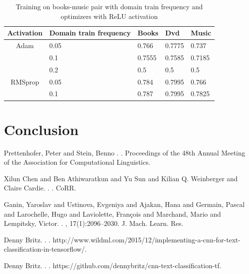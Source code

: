 \documentclass[11pt,a4paper]{article}
\begin{document}
\begin{table}[h]
\begin{center}
\begin{tabular}{|c|l|l|l|l|}
\hline
Activation & \multicolumn{1}{|p{1cm}|}{Domain train frequency}& Books & Dvd & Music \\
\hline
Adam & 0.05 & 0.766 & 0.7775 & 0.737 \\
 & 0.1 & 0.7555 & 0.7585 & 0.7185 \\
 & 0.2 & 0.5 & 0.5 & 0.5 \\
\hline
RMSprop & 0.05 & 0.784 & 0.7995 & 0.766 \\
 & 0.1 & 0.787 & 0.7995 & 0.7825 \\
\hline
\end{tabular}
\end{center}
\caption{ Training on books-music pair with domain train frequency and optimizers with ReLU activation}
\label{1d-optimizer-table}
\end{table}





\section{Conclusion}



%
%

\begin{thebibliography}{}
Prettenhofer, Peter and Stein, Benno
.
.
\newblock Proceedings of the 48th Annual Meeting of the Association for Computational Linguistics.

Xilun Chen and Ben Athiwaratkun and Yu Sun and Kilian Q. Weinberger and Claire Cardie.
.
.
\newblock CoRR.

Ganin, Yaroslav and Ustinova, Evgeniya and Ajakan, Hana and Germain, Pascal and Larochelle, Hugo and Laviolette, Fran\c{c}ois and Marchand, Mario and Lempitsky, Victor.
.
,
  17(1):2096--2030.
\newblock J. Mach. Learn. Res.

Denny Britz.
.
.
\newblock http://www.wildml.com/2015/12/implementing-a-cnn-for-text-classification-in-tensorflow/.

Denny Britz.
.
.
\newblock https://github.com/dennybritz/cnn-text-classification-tf.


\end{thebibliography}
\end{document}
